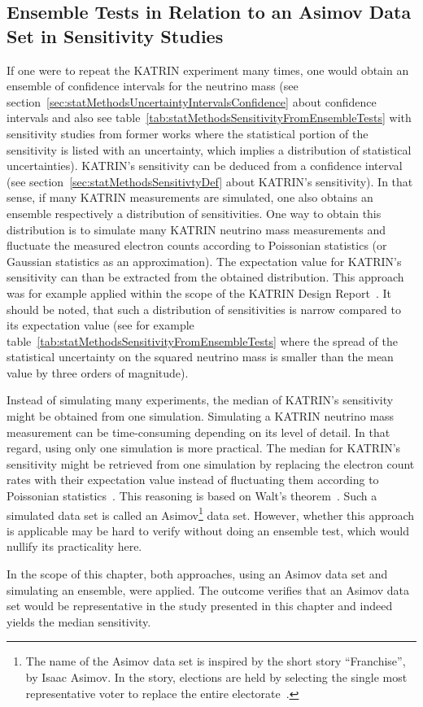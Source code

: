 \subsection{Ensemble Tests in Relation to an Asimov Data Set in Sensitivity Studies}
\label{sec:katrinElossStatisticsAsimov}
If one were to repeat the KATRIN experiment many times, one would obtain an ensemble of confidence intervals for the neutrino mass (see section~\ref{sec:statMethodsUncertaintyIntervalsConfidence} about confidence intervals and also see table~\ref{tab:statMethodsSensitivityFromEnsembleTests} with sensitivity studies from former works where the statistical portion of the sensitivity is listed with an uncertainty, which implies a distribution of statistical uncertainties). KATRIN's sensitivity can be deduced from a confidence interval (see section~\ref{sec:statMethodsSensitivtyDef} about KATRIN's sensitivity). In that sense, if many KATRIN measurements are simulated, one also obtains an ensemble respectively a distribution of sensitivities. One way to obtain this distribution is to simulate many KATRIN neutrino mass measurements and fluctuate the measured electron counts according to Poissonian statistics (or Gaussian statistics as an approximation). The expectation value for KATRIN's sensitivity can than be extracted from the obtained distribution. This approach was for example applied within the scope of the KATRIN Design Report~\cite{Angrik:2005ep}. It should be noted, that such a distribution of sensitivities is narrow compared to its expectation value (see for example table~\ref{tab:statMethodsSensitivityFromEnsembleTests} where the spread of the statistical uncertainty on the squared neutrino mass is smaller than the mean value by three orders of magnitude).

Instead of simulating many experiments, the median of KATRIN's sensitivity might be obtained from one simulation. Simulating a KATRIN neutrino mass measurement can be time-consuming depending on its level of detail. In that regard, using only one simulation is more practical. The median for KATRIN's sensitivity might be retrieved from one simulation by replacing the electron count rates with their expectation value instead of fluctuating them according to Poissonian statistics~\cite{Cowan2011}. This reasoning is based on Walt's theorem~\cite{Wald1944}. Such a simulated data set is called an Asimov\footnote{The name of the Asimov data set is inspired by the short story ``Franchise'', by Isaac Asimov. In the story, elections are held by selecting the single most representative voter to replace the entire electorate~\cite{Cowan2011}.} data set. However, whether this approach is applicable may be hard to verify without doing an ensemble test, which would nullify its practicality here.

In the scope of this chapter, both approaches, using an Asimov data set and simulating an ensemble, were applied. The outcome verifies that an Asimov data set would be representative in the study presented in this chapter and indeed yields the median sensitivity.